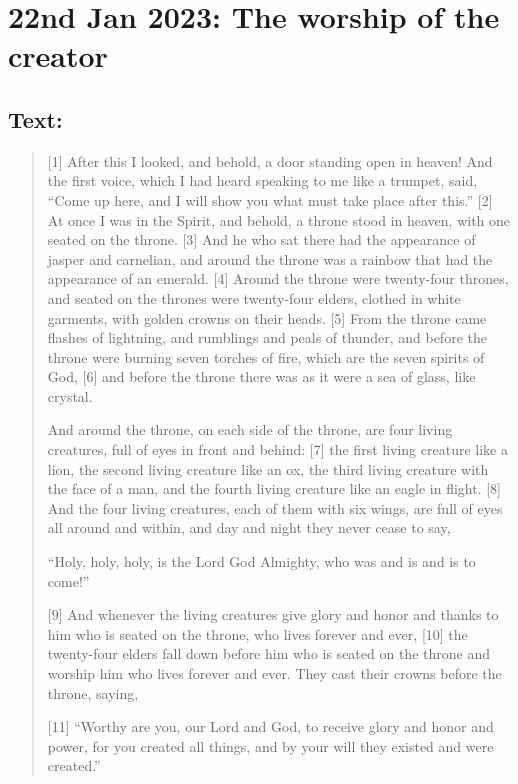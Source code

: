 \section{22nd Jan 2023: The worship of the creator}
\subsection*{Text: }
  \begin{quote}
    [1] After this I looked, and behold, a door standing open in heaven!  And
    the first voice, which I had heard speaking to me like a trumpet, said,
    “Come up here, and I will show you what must take place after this.” [2]
    At once I was in the Spirit, and behold, a throne stood in heaven, with
    one seated on the throne.  [3] And he who sat there had the appearance of
    jasper and carnelian, and around the throne was a rainbow that had the
    appearance of an emerald.  [4] Around the throne were twenty-four
    thrones, and seated on the thrones were twenty-four elders, clothed in
    white garments, with golden crowns on their heads.  [5] From the throne
    came flashes of lightning, and rumblings and peals of thunder, and before
    the throne were burning seven torches of fire, which are the seven
    spirits of God, [6] and before the throne there was as it were a sea of
    glass, like crystal.

    And around the throne, on each side of the throne, are four living
    creatures, full of eyes in front and behind: [7] the first living
    creature like a lion, the second living creature like an ox, the third
    living creature with the face of a man, and the fourth living creature
    like an eagle in flight.  [8] And the four living creatures, each of them
    with six wings, are full of eyes all around and within, and day and night
    they never cease to say,

    “Holy, holy, holy, is the Lord God Almighty,
        who was and is and is to come!”

    [9] And whenever the living creatures give glory and honor and thanks to
    him who is seated on the throne, who lives forever and ever, [10] the
    twenty-four elders fall down before him who is seated on the throne and
    worship him who lives forever and ever.  They cast their crowns before
    the throne, saying,

    [11] “Worthy are you, our Lord and God,
        to receive glory and honor and power,
    for you created all things,
        and by your will they existed and were created.”
  \end{quote}
